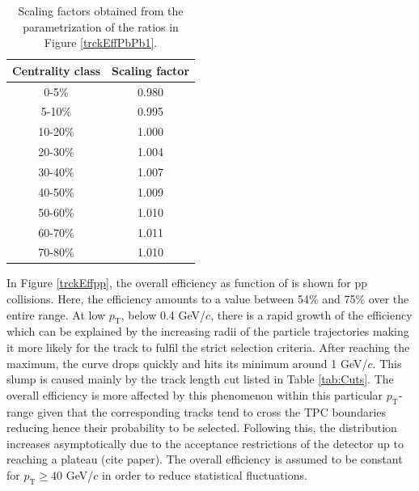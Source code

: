 \documentclass[12pt,a4paper]{report}
\begin{document}
\begin{table}[tb!]
\centering
\renewcommand{\arraystretch}{1.5}
\begin{tabular}{|c|c|}
\toprule
\rowcolor{headerBlue} \textbf{Centrality class} &  \textbf{Scaling factor}\\
\midrule
0-5\%	&	0.980	 \\
5-10\%	&	0.995	 \\
10-20\%	&	1.000	 \\
20-30\%	&	1.004	 \\
30-40\%	&	1.007	 \\
40-50\%	&	1.009	 \\
50-60\%	&	1.010	 \\
60-70\%	&	1.011	 \\
70-80\%	&	1.010	 \\
\bottomrule
\end{tabular}
\caption{Scaling factors obtained from the parametrization of the ratios in Figure \ref{trckEffPbPb1}.}
\label{tab:ScalingFactors}
\end{table} 
\hspace{-0.3cm} In Figure \ref{trckEffpp}, the overall efficiency as function of \pt is shown for pp collisions. Here, the efficiency amounts to a value between 54\% and 75\% over the entire \pt range. At low $p_\text{T}$, below 0.4 GeV/$c$, there is a rapid growth of the efficiency which can be explained by the increasing radii of the particle trajectories making it more likely for the track to fulfil the strict selection criteria. After reaching the maximum, the curve drops quickly and hits its minimum around 1 GeV/$c$. This slump is caused mainly by the track length cut listed in Table \ref{tab:Cuts}. The overall efficiency is more affected by this phenomenon within this particular $p_\text{T}$-range given that the corresponding tracks tend to cross the TPC boundaries reducing hence their probability to be selected. Following this, the distribution increases asymptotically due to the acceptance restrictions of the detector up to reaching a plateau (cite paper). The overall efficiency is assumed to be constant for $p_\text{T} \geq 40$ GeV/$c$ in order to reduce statistical fluctuations. \\
\end{document}

